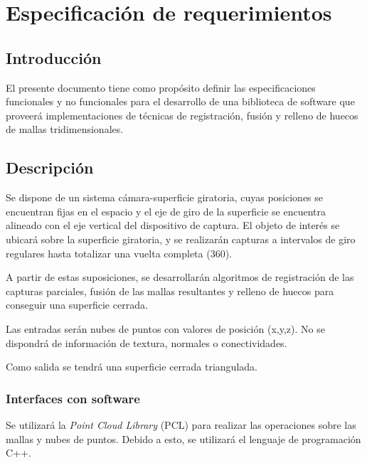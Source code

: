 \chapter{Especificación de requerimientos}

	\section{Introducción}
	El presente documento tiene como propósito definir las especificaciones
	funcionales y no funcionales para el desarrollo de una biblioteca de
	software que proveerá implementaciones de técnicas de registración, fusión
	y relleno de huecos de mallas tridimensionales.

	\section{Descripción}
		Se dispone de un sistema cámara-superficie giratoria, cuyas posiciones
		se encuentran fijas en el espacio y el eje de giro de la superficie se
		encuentra alineado con el eje vertical del dispositivo de captura.
		El objeto de interés se ubicará sobre la superficie giratoria, y se
		realizarán capturas a intervalos de giro regulares
		hasta totalizar una vuelta completa (360\textdegree).

		A partir de estas suposiciones, se desarrollarán algoritmos de
		registración de las capturas parciales,
		fusión de las mallas resultantes
		y relleno de huecos para conseguir una superficie cerrada.

		Las entradas serán nubes de puntos con valores de posición (x,y,z).
		No se dispondrá de información de textura, normales o conectividades.

		Como salida se tendrá una superficie cerrada triangulada.

		\subsection{Interfaces con software}
			Se utilizará la \emph{Point Cloud Library} (PCL)
			para realizar las operaciones sobre las mallas y nubes de puntos.
			Debido a esto, se utilizará el lenguaje de programación C++.


